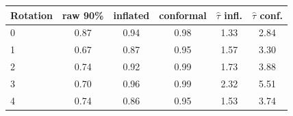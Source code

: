 \begin{tabular}{@{}lccccc@{}}
\toprule
Rotation & raw 90\% & inflated & conformal & $\hat\tau$ infl. & $\hat\tau$ conf. \\
\midrule
0 & 0.87 & 0.94 & 0.98 & 1.33 & 2.84 \\
1 & 0.67 & 0.87 & 0.95 & 1.57 & 3.30 \\
2 & 0.74 & 0.92 & 0.99 & 1.73 & 3.88 \\
3 & 0.70 & 0.96 & 0.99 & 2.32 & 5.51 \\
4 & 0.74 & 0.86 & 0.95 & 1.53 & 3.74 \\
\bottomrule
\end{tabular}
